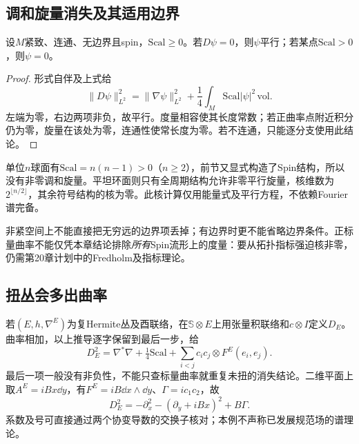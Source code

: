 \subsection{调和旋量消失及其适用边界}
\begin{corollary}\label{cor:spin-vanishing}
设$M$紧致、连通、无边界且spin，$\mathrm{Scal}\geq0$。若$D\psi=0$，则$\psi$平行；若某点$\mathrm{Scal}>0$，则$\psi=0$。
\end{corollary}
\begin{proof}
形式自伴及上式给
\begin{equation}\label{eq:spin-energy}
 \|D\psi\|_{L^2}^2=\|\nabla\psi\|_{L^2}^2
 +\frac14\int_M\mathrm{Scal}|\psi|^2\,\mathrm{vol}.
\end{equation}
左端为零，右边两项非负，故平行。度量相容使其长度常数；若正曲率点附近积分仍为零，旋量在该处为零，连通性使常长度为零。若不连通，只能逐分支使用此结论。
\end{proof}
单位$n$球面有$\mathrm{Scal}=n(n-1)>0$（$n\geq2$），前节又显式构造了Spin结构，所以没有非零调和旋量。平坦环面则只有全周期结构允许非零平行旋量，核维数为$2^{\lfloor n/2\rfloor}$，其余符号结构的核为零。此核计算仅用能量式及平行方程，不依赖Fourier谱完备。

非紧空间上不能直接把无穷远的边界项丢掉；有边界时更不能省略边界条件。正标量曲率不能仅凭本章结论排除\emph{所有}Spin流形上的度量：要从拓扑指标强迫核非零，仍需第20章计划中的Fredholm及指标理论。

\subsection{扭丛会多出曲率}
若$(E,h,\nabla^E)$为复Hermite丛及酉联络，在$\mathbb S\otimes E$上用张量积联络和$c\otimes I$定义$D_E$。曲率相加，以上推导逐字保留到最后一步，给
\begin{equation}\label{eq:twisted-lichnerowicz}
 D_E^2=\nabla^*\nabla+\tfrac14\mathrm{Scal}
 +\sum_{i<j}c_ic_j\otimes F^E(e_i,e_j).
\end{equation}
最后一项一般没有非负性，不能只查标量曲率就重复未扭的消失结论。二维平面上取$A^E=iBx\dd y$，有$F^E=iB\dd x\wedge\dd y$、$\Gamma=ic_1c_2$，故
\[
 D_E^2=-\partial_x^2-(\partial_y+iBx)^2+B\Gamma.
\]
系数及号可直接通过两个协变导数的交换子核对；本例不声称已发展规范场的谱理论。
